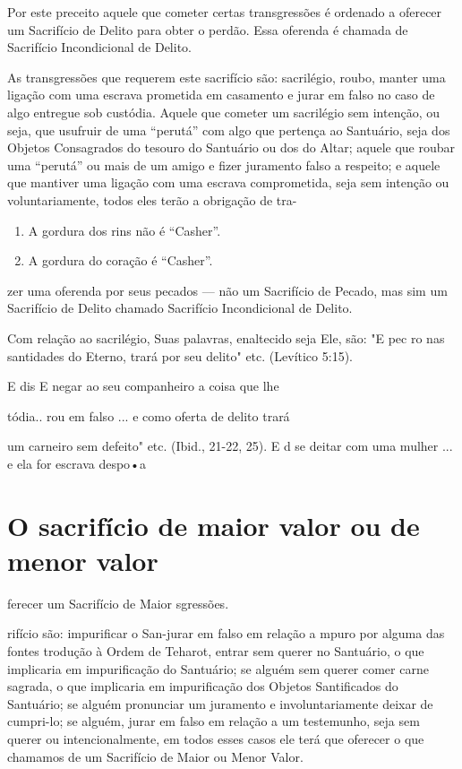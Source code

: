 Por este preceito aquele que cometer certas transgressões é ordena­do a
oferecer um Sacrifício de Delito para obter o perdão. Essa oferenda é
cha­mada de Sacrifício Incondicional de Delito.

As transgressões que requerem este sacrifício são: sacrilégio, roubo,
manter uma ligação com uma escrava prometida em casamento e jurar em
falso no caso de algo entregue sob custódia. Aquele que cometer um
sacrilégio sem intenção, ou seja, que usufruir de uma ``perutá'' com algo
que pertença ao San­tuário, seja dos Objetos Consagrados do tesouro do
Santuário ou dos do Altar; aquele que roubar uma ``perutá'' ou mais de um
amigo e fizer juramento falso a respeito; e aquele que mantiver uma
ligação com uma escrava comprometi­da, seja sem intenção ou
voluntariamente, todos eles terão a obrigação de tra-


\begin{enumerate}
\def\labelenumi{\arabic{enumi}.}
\setcounter{enumi}{87}
\item
 
 A gordura dos rins não é ``Casher''.
 
\item
 
 A gordura do coração é ``Casher''.
 
\end{enumerate}

zer uma oferenda por seus pecados --- não um Sacrifício de Pecado, mas
sim um Sacrifício de Delito chamado Sacrifício Incondicional de Delito.

Com relação ao sacrilégio, Suas palavras, enaltecido seja Ele, são: "E
pec ro nas santidades do Eterno, trará por seu delito" etc. (Levítico
5:15).

E dis E negar ao seu companheiro a coisa que lhe

tódia.. rou em falso ... e como oferta de delito trará

um carneiro sem defeito" etc. (Ibid., 21-22, 25). E d se deitar com uma
mulher ... e ela for escrava despo•a

\section{O sacrifício de maior valor ou de menor valor}


ferecer um Sacrifício de Maior sgressões.


rifício são: impurificar o San-jurar em falso em relação a mpuro por
alguma das fontes trodução à Ordem de Teharot, entrar sem querer no
Santuário, o que implicaria em impurificação do Santuá­rio; se alguém
sem querer comer carne sagrada, o que implicaria em impurifi­cação dos
Objetos Santificados do Santuário; se alguém pronunciar um jura­mento e
involuntariamente deixar de cumpri-lo; se alguém, jurar em falso em
relação a um testemunho, seja sem querer ou intencionalmente, em todos
es­ses casos ele terá que oferecer o que chamamos de um Sacrifício de
Maior ou Menor Valor.


